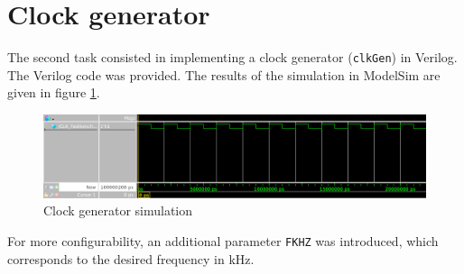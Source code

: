 \section{Clock generator}

The second task consisted in implementing a clock generator (\texttt{clkGen}) in Verilog. The Verilog code was provided. The results of the simulation in ModelSim are given in figure \ref{fig:clkGenSimulation}.

\begin{figure}[h]
	\centering
	\includegraphics[scale=0.6]{images/BasicComponents/Task2ClkGenSimulation.png}
	\caption{Clock generator simulation}
	\label{fig:clkGenSimulation}	
\end{figure}

For more configurability, an additional parameter \texttt{FKHZ} was introduced, which corresponds to the desired frequency in kHz.